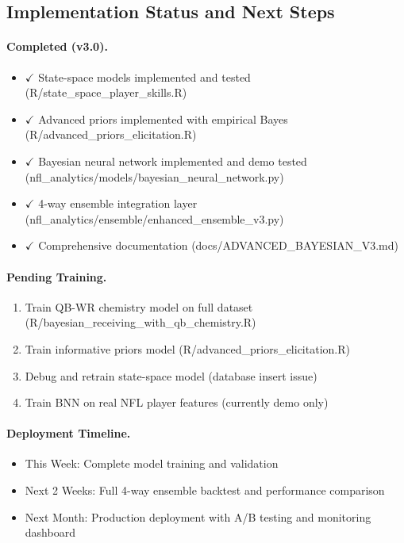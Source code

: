 \subsection{Implementation Status and Next Steps}

\paragraph{Completed (v3.0).}
\begin{itemize}
  \item $\checkmark$ State-space models implemented and tested (R/state\_space\_player\_skills.R)
  \item $\checkmark$ Advanced priors implemented with empirical Bayes (R/advanced\_priors\_\allowbreak elicitation.R)
  \item $\checkmark$ Bayesian neural network implemented and demo tested (nfl\_analytics/models/bayesian\_neural\_network.py)
  \item $\checkmark$ 4-way ensemble integration layer (nfl\_analytics/ensemble/enhanced\_ensemble\_v3.py)
  \item $\checkmark$ Comprehensive documentation (docs/ADVANCED\_BAYESIAN\_V3.md)
\end{itemize}

\paragraph{Pending Training.}
\begin{enumerate}
  \item Train QB-WR chemistry model on full dataset (R/bayesian\_receiving\_\allowbreak with\_qb\_chemistry.R)
  \item Train informative priors model (R/advanced\_priors\_elicitation.R)
  \item Debug and retrain state-space model (database insert issue)
  \item Train BNN on real NFL player features (currently demo only)
\end{enumerate}

\paragraph{Deployment Timeline.}
\begin{itemize}
  \item This Week: Complete model training and validation
  \item Next 2 Weeks: Full 4-way ensemble backtest and performance comparison
  \item Next Month: Production deployment with A/B testing and monitoring dashboard
\end{itemize}

